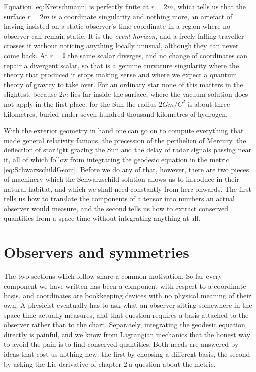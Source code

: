         Equation \ref{eq:Kretschmann} is perfectly finite at $r=2m$, which tells us that the surface $r=2m$ is a coordinate singularity and nothing more, an artefact of having insisted on a static observer's time coordinate in a region where no observer can remain static. It is the \textit{event horizon}, and a freely falling traveller crosses it without noticing anything locally unusual, although they can never come back. At $r=0$ the same scalar diverges, and no change of coordinates can repair a divergent scalar, so that is a genuine curvature singularity where the theory that produced it stops making sense and where we expect a quantum theory of gravity to take over. For an ordinary star none of this matters in the slightest, because $2m$ lies far inside the surface, where the vacuum solution does not apply in the first place: for the Sun the radius $2Gm/C^2$ is about three kilometres, buried under seven hundred thousand kilometres of hydrogen.

        With the exterior geometry in hand one can go on to compute everything that made general relativity famous, the precession of the perihelion of Mercury, the deflection of starlight grazing the Sun and the delay of radar signals passing near it, all of which follow from integrating the geodesic equation in the metric \ref{eq:SchwarzschildGeom}. Before we do any of that, however, there are two pieces of machinery which the Schwarzschild solution allows us to introduce in their natural habitat, and which we shall need constantly from here onwards. The first tells us how to translate the components of a tensor into numbers an actual observer would measure, and the second tells us how to extract conserved quantities from a space-time without integrating anything at all.

\section{Observers and symmetries}

    The two sections which follow share a common motivation. So far every component we have written has been a component with respect to a coordinate basis, and coordinates are bookkeeping devices with no physical meaning of their own. A physicist eventually has to ask what an observer sitting somewhere in the space-time actually measures, and that question requires a basis attached to the observer rather than to the chart. Separately, integrating the geodesic equation directly is painful, and we know from Lagrangian mechanics that the honest way to avoid the pain is to find conserved quantities. Both needs are answered by ideas that cost us nothing new: the first by choosing a different basis, the second by asking the Lie derivative of chapter 2 a question about the metric.

